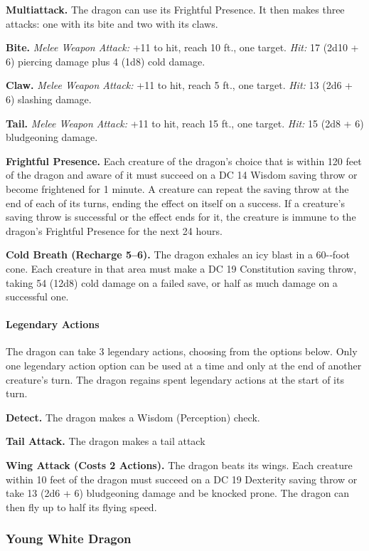 \documentclass[
]{article}
\begin{document}
\textbf{Multiattack.} The dragon can use its Frightful Presence. It then
makes three attacks: one with its bite and two with its claws.

\textbf{Bite.} \emph{Melee Weapon Attack:} +11 to hit, reach 10 ft., one
target. \emph{Hit:} 17 (2d10 + 6) piercing damage plus 4 (1d8) cold
damage.

\textbf{Claw.} \emph{Melee Weapon Attack:} +11 to hit, reach 5 ft., one
target. \emph{Hit:} 13 (2d6 + 6) slashing damage.

\textbf{Tail.} \emph{Melee Weapon Attack:} +11 to hit, reach 15 ft., one
target. \emph{Hit:} 15 (2d8 + 6) bludgeoning damage.

\textbf{Frightful Presence.} Each creature of the dragon's choice that
is within 120 feet of the dragon and aware of it must succeed on a DC 14
Wisdom saving throw or become frightened for 1 minute. A creature can
repeat the saving throw at the end of each of its turns, ending the
effect on itself on a success. If a creature's saving throw is
successful or the effect ends for it, the creature is immune to the
dragon's Frightful Presence for the next 24 hours.

\textbf{Cold Breath (Recharge 5--6).} The dragon exhales an icy blast in
a 60-­‐foot cone. Each creature in that area must make a DC 19
Constitution saving throw, taking 54 (12d8) cold damage on a failed
save, or half as much damage on a successful one.

\hypertarget{legendary-actions-9}{%
\paragraph{Legendary Actions}\label{legendary-actions-9}}

The dragon can take 3 legendary actions, choosing from the options
below. Only one legendary action option can be used at a time and only
at the end of another creature's turn. The dragon regains spent
legendary actions at the start of its turn.

\textbf{Detect.} The dragon makes a Wisdom (Perception) check.

\textbf{Tail Attack.} The dragon makes a tail attack

\textbf{Wing Attack (Costs 2 Actions).} The dragon beats its wings. Each
creature within 10 feet of the dragon must succeed on a DC 19 Dexterity
saving throw or take 13 (2d6 + 6) bludgeoning damage and be knocked
prone. The dragon can then fly up to half its flying speed.

\hypertarget{young-white-dragon}{%
\subsubsection{Young White Dragon}\label{young-white-dragon}}
\end{document}
